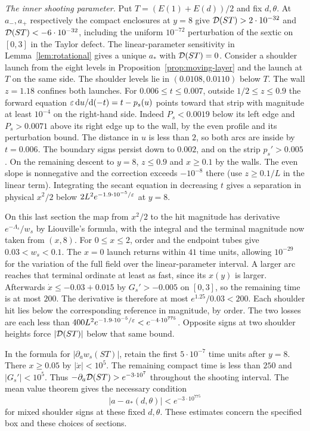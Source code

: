 \emph{The inner shooting parameter.}
Put $T=(E(1)+E(d))/2$ and fix $d,\theta$. At $a_-,a_+$ respectively
the compact enclosures at $y=8$ give
$\mathcal{D}(ST)>2\cdot10^{-32}$ and $\mathcal{D}(ST)<-6\cdot10^{-32}$, including the
uniform $10^{-72}$ perturbation of the sextic on $[0,3]$ in the
Taylor defect. The linear-parameter sensitivity in
Lemma~\ref{lem:rotational} gives a unique $a_*$ with $\mathcal{D}(ST)=0$.
Consider a shoulder launch from the eight levels in
Proposition~\ref{prop:moving-layer} and the launch at $T$ on the same side.
The shoulder levels lie in $(0.0108,0.0110)$ below $T$.
The wall $z=1.18$ confines both launches. For $0.006\le t\le0.007$,
outside $1/2\le z\le0.9$ the forward equation
$\varepsilon\,\mathrm{d} u/\mathrm{d}(-t)=t-p_s(u)$ points toward that strip with magnitude
at least $10^{-4}$ on the right-hand side. Indeed $P_s<0.0019$ below its
left edge and $P_s>0.0071$ above its right edge up to the wall, by
the even profile and its perturbation bound. The distance in $u$ is
less than $2$, so both arcs are inside by $t=0.006$. The boundary
signs persist down to $0.002$, and on the strip $p_s'>0.005$.
On the remaining descent to $y=8$, $z\le0.9$ and $x\ge0.1$ by the
walls. The even slope is nonnegative and the correction exceeds
$-10^{-8}$ there (use $z\ge0.1/L$ in the linear term).
Integrating the secant equation in decreasing $t$ gives a separation
in physical $x^2/2$ below $2L^2e^{-1.9\cdot10^{-5}/\varepsilon}$ at $y=8$.

On this last section the map from $x^2/2$ to the hit magnitude has
derivative $e^{-\Lambda_s}/w_s$ by Liouville's formula, with the
integral and the terminal magnitude now taken from $(x,8)$. For $0\le x\le2$,
order and the endpoint tubes give $0.03<w_s<0.1$. The $x=0$ launch
returns within $41$ time units, allowing $10^{-29}$ for the variation
of the full field over the linear-parameter interval. A larger arc
reaches that terminal ordinate at least as fast, since its $x(y)$ is
larger. Afterwards $\dot x\le-0.03+0.015$ by $G_s'>-0.005$ on
$[0,3]$, so the remaining time is at most $200$. The derivative is
therefore at most $e^{1.25}/0.03<200$. Each shoulder hit lies below
the corresponding reference in magnitude, by order. The two losses
are each less than $400L^2e^{-1.9\cdot10^{-5}/\varepsilon}
<e^{-4\cdot10^{775}}$. Opposite signs at two shoulder heights force
$|\mathcal{D}(ST)|$ below that same bound.

In the formula for $|\partial_a w_s(ST)|$, retain the first
$5\cdot10^{-7}$ time units after $y=8$. There $x\ge0.05$ by
$|\dot x|<10^5$. The remaining compact time is less than $250$ and
$|G_s'|<10^5$. Thus $-\partial_a\mathcal{D}(ST)>e^{-3\cdot10^7}$ throughout
the shooting interval. The mean value theorem gives the necessary
condition
\[
    |a-a_*(d,\theta)|<e^{-3\cdot10^{775}}
\]
for mixed shoulder signs at these fixed $d,\theta$. These estimates
concern the specified box and these choices of sections.

